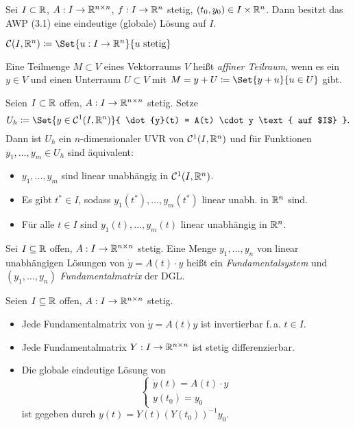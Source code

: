 \documentclass{cheat-sheet}
\begin{document}
\begin{satz}
  Sei $I \subset \mathbb{R}$, $A : I \to \mathbb{R}^{n \times n}$, $f : I \to \mathbb{R}^n$ stetig, $(t_0, y_0) \in I \times \mathbb{R}^n$. Dann besitzt das AWP (3.1) eine eindeutige (globale) Lösung auf $I$.
\end{satz}

\begin{nota}
  $\mathcal{C}(I, \R^n) \coloneqq \Set{ u : I \to \R^n }{ u \text{ stetig} }$
\end{nota}


\begin{defn}
  Eine Teilmenge $M \subset V$ eines Vektorraums $V$ heißt \emph{affiner Teilraum}, wenn es ein $y \in V$ und einen Unterraum $U \subset V$ mit $M = y + U \coloneqq \Set{ y + u }{ u \in U }$ gibt.
\end{defn}

\begin{satz}
  Seien $I \subset \mathbb{R}$ offen, $A : I \to \mathbb{R}^{n \times n}$ stetig. Setze
  \[ U_h \coloneqq \Set{ y \in \mathcal{C}^1(I, \R^n) }{ \dot{y}(t) = A(t) \cdot y \text{ auf $I$} }. \]
  Dann ist $U_h$ ein $n$-dimensionaler UVR von $\mathcal{C}^1(I, \mathbb{R}^n)$ und für Funktionen $y_1, ..., y_m \in U_h$ sind äquivalent:
  \begin{itemize}
    \item $y_1, ..., y_m$ sind linear unabhängig in $\mathcal{C}^1(I, \mathbb{R}^n)$.
    \item Es gibt $t^* \in I$, sodass $y_1(t^*), ..., y_m(t^*)$ linear unabh. in $\mathbb{R}^n$ sind.
    \item Für alle $t \in I$ sind $y_1(t), ..., y_m(t)$ linear unabhängig in $\mathbb{R}^n$.
  \end{itemize}
\end{satz}


\begin{defn}
  Sei $I \subseteq \mathbb{R}$ offen, $A : I \to \mathbb{R}^{n \times n}$ stetig. Eine Menge $y_1, ..., y_n$ von linear unabhängigen Lösungen von $\dot{y} = A(t) \cdot y$ heißt ein \emph{Fundamentalsystem} und $(y_1, ..., y_n)$ \emph{Fundamentalmatrix} der DGL.
\end{defn}

\begin{satz}
  Seien $I \subseteq \mathbb{R}$ offen, $A : I \to \mathbb{R}^{n \times n}$ stetig.
  \begin{itemize}
    \item Jede Fundamentalmatrix von $\dot{y} = A(t) y$ ist invertierbar f.\,a. $t \in I$.
    \item Jede Fundamentalmatrix $Y : I \to \mathbb{R}^{n \times n}$ ist stetig differenzierbar.
    \item Die globale eindeutige Lösung von
    \[
      \left\{ \begin{array}{l}
        \dot{y}(t) = A(t) \cdot y\\
        y(t_0) = y_0
        \end{array}
      \right.
    \]
    ist gegeben durch $y(t) = Y(t) \left( Y(t_0) \right)^{-1} y_0$.
  \end{itemize}
\end{satz}
\end{document}
